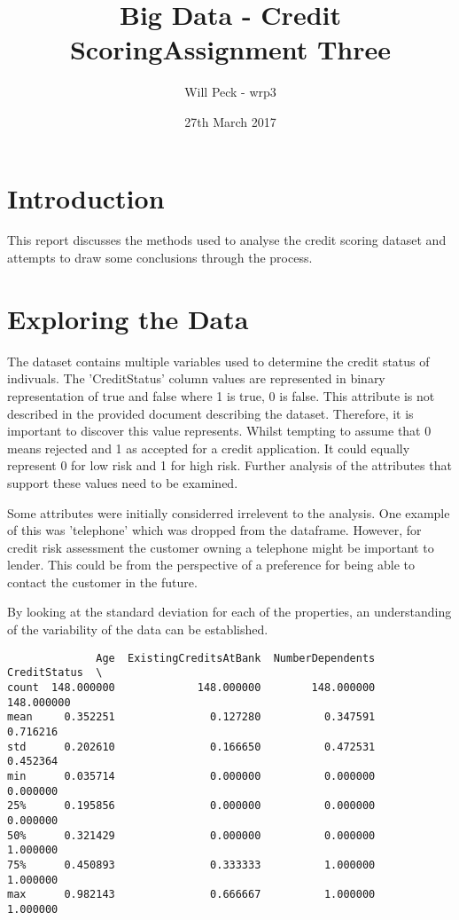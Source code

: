 \documentclass[a4paper]{article}
\title{Big Data - Credit Scoring}
\title{Assignment Three}
\date{27th March 2017}
\author{Will Peck - wrp3}
\begin{document}
\maketitle
\newpage
\tableofcontents
\newpage
\section{Introduction}
This report discusses the methods used to analyse the credit scoring dataset and attempts to draw some conclusions through the process.

\section{Exploring the Data}
The dataset contains multiple variables used to determine the credit status of indivuals.  The 'CreditStatus' column values are represented in binary representation of true and false where 1 is true, 0 is false.  This attribute is not described in the provided document describing the dataset.  Therefore, it is important to discover this value represents.  Whilst tempting to assume that 0 means rejected and 1 as accepted for a credit application.  It could equally represent 0 for low risk and 1 for high risk.  Further analysis of the attributes that support these values need to be examined.

Some attributes were initially considerred irrelevent to the analysis.  One example of this was 'telephone' which was dropped from the dataframe.  However, for credit risk assessment the customer owning a telephone might be important to lender.  This could be from the perspective of a preference for being able to contact the customer in the future.

By looking at the standard deviation for each of the properties, an understanding of the variability of the data can be established.

\begin{lstlisting}
              Age  ExistingCreditsAtBank  NumberDependents  CreditStatus  \
count  148.000000             148.000000        148.000000    148.000000   
mean     0.352251               0.127280          0.347591      0.716216   
std      0.202610               0.166650          0.472531      0.452364   
min      0.035714               0.000000          0.000000      0.000000   
25%      0.195856               0.000000          0.000000      0.000000   
50%      0.321429               0.000000          0.000000      1.000000   
75%      0.450893               0.333333          1.000000      1.000000   
max      0.982143               0.666667          1.000000      1.000000  
\end{lstlisting}
\end{document}
